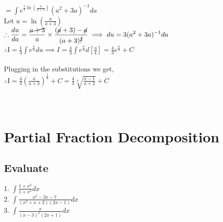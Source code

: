 \documentclass[14pt]{article}
\begin{document}
	$\displaystyle = \int e^{\frac{1}{4}\ln(\frac{a}{a+3})} (a^2+3a)^{-1}da$\\
	Let $\displaystyle u=\ln \left(\frac{a}{a+3}\right)$\\
	$\displaystyle \therefore \frac{du}{da} = \frac{\cancel{a+3}}{a}\times\frac{(\cancel{a}+3)-\cancel{a}}{(a+3)^{\cancel{2}}}\implies du = 3(a^2+3a)^{-1}da$\\
	$\displaystyle \therefore \text{I} = \frac{1}{3}\int e^{\frac{u}{4}}du \implies I = \frac{4}{3} \int e^{\frac{u}{4}} d\left[\frac{u}{4}\right] = \frac{4}{3} e^{\frac{u}{4}} + C$ \\ \\
	Plugging in the substitutions we get,\\
	$\displaystyle
		\therefore \text{I} = \frac{4}{3} (\frac{a}{a+3})^{\frac{1}{4}} +C=\boxed{\frac{4}{3} \sqrt[4]{\frac{x-1}{x+2}} +C}
	$
	\\ \\ \\
	\section{Partial Fraction Decomposition}
	\subsection{Evaluate}
	1. $\displaystyle \int \frac{1+x^3}{1+x^2}dx$ \\
	2. $\displaystyle \int \frac{x^2-3x-7}{(x^2+x+2)(2x-1)}dx$ \\
	3. $\displaystyle \int \frac{x}{(x-3)^2(2x+1)}dx$
\end{document}
